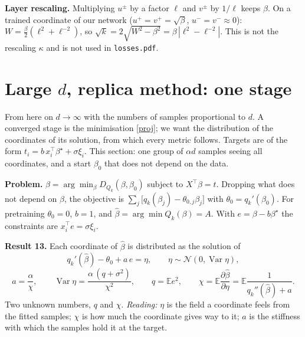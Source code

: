 \documentclass[10pt]{article}
\newcommand{\bs}{\beta^\star}\newcommand{\E}{\mathbb E}\newcommand{\asinh}{\operatorname{arcsinh}}\newcommand{\sk}{\sqrt k}
\begin{document}
\textbf{Layer rescaling.} Multiplying $u^\pm$ by a factor $\ell$ and $v^\pm$ by $1/\ell$ keeps $\beta$. On a trained coordinate of our network ($u^+=v^+=\sqrt\beta$, $u^-=v^-\approx0$): $W=\frac\beta2(\ell^2+\ell^{-2})$, so $\sk=2\sqrt{W^2-\beta^2}=\beta\,|\ell^2-\ell^{-2}|$. This is not the rescaling $\kappa$ and is not used in \texttt{losses.pdf}.

\section{Large $d$, replica method: one stage}\label{rep1}
From here on $d\to\infty$ with the numbers of samples proportional to $d$. A converged stage is the minimisation \eqref{proj}; we want the distribution of the coordinates of its solution, from which every metric follows. Targets are of the form $t_i=b\,x_i^\top\bs+\sigma\xi_i$. This section: one group of $\alpha d$ samples seeing all coordinates, and a start $\beta_0$ that does not depend on the data.

\textbf{Problem.} $\hat\beta=\arg\min_\beta D_{Q_k}(\beta,\beta_0)$ subject to $X^\top\beta=t$. Dropping what does not depend on $\beta$, the objective is $\sum_j\big[q_k(\beta_j)-\theta_{0,j}\beta_j\big]$ with $\theta_0=q_k'(\beta_0)$. For pretraining $\theta_0=0$, $b=1$, and $\hat\beta=\arg\min Q_k(\beta)=A$. With $e=\beta-b\bs$ the constraints are $x_i^\top e=\sigma\xi_i$.

\textbf{Result 13.} Each coordinate of $\hat\beta$ is distributed as the solution of
\begin{equation}\label{ch1}
q_k'(\hat\beta)-\theta_0+a\,e=\eta,\qquad\eta\sim\mathcal N(0,\operatorname{Var}\eta),
\end{equation}
\begin{equation}\label{fp1}
a=\frac\alpha\chi,\qquad\operatorname{Var}\eta=\frac{\alpha\,(q+\sigma^2)}{\chi^2},\qquad q=\E e^2,\qquad\chi=\E\frac{\partial\hat\beta}{\partial\eta}=\E\frac1{q_k''(\hat\beta)+a}.
\end{equation}
Two unknown numbers, $q$ and $\chi$. \emph{Reading:} $\eta$ is the field a coordinate feels from the fitted samples; $\chi$ is how much the coordinate gives way to it; $a$ is the stiffness with which the samples hold it at the target.
\end{document}
